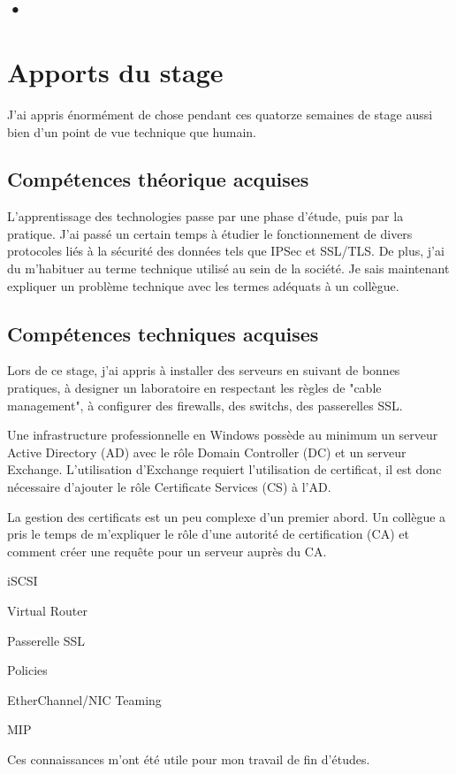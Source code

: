 \subsection{•}

\section{Apports du stage}
J'ai appris énormément de chose pendant ces quatorze semaines de stage aussi bien d'un point de vue technique que humain.

\subsection{Compétences théorique acquises}
L'apprentissage des technologies passe par une phase d'étude, puis par la pratique.
J'ai passé un certain temps à étudier le fonctionnement de divers protocoles liés à la sécurité des données tels que IPSec et SSL/TLS.
De plus, j'ai du m'habituer au terme technique utilisé au sein de la société.
Je sais maintenant expliquer un problème technique avec les termes adéquats à un collègue.

\subsection{Compétences techniques acquises}
Lors de ce stage, j'ai appris à installer des serveurs en suivant de bonnes pratiques, à designer un laboratoire en respectant les règles de "cable management", à configurer des firewalls, des switchs, des passerelles SSL. 

Une infrastructure professionnelle en Windows possède au minimum un serveur Active Directory (AD) avec le rôle Domain Controller (DC) et un serveur Exchange. 
L'utilisation d'Exchange requiert l'utilisation de certificat, il est donc nécessaire d'ajouter le rôle Certificate Services (CS) à l'AD.

La gestion des certificats est un peu complexe d'un premier abord.
Un collègue a pris le temps de m'expliquer le rôle d'une autorité de certification (CA) et comment créer une requête pour un serveur auprès du CA. 

iSCSI

Virtual Router

Passerelle SSL 

Policies

EtherChannel/NIC Teaming

MIP


Ces connaissances m'ont été utile pour mon travail de fin d'études. 
